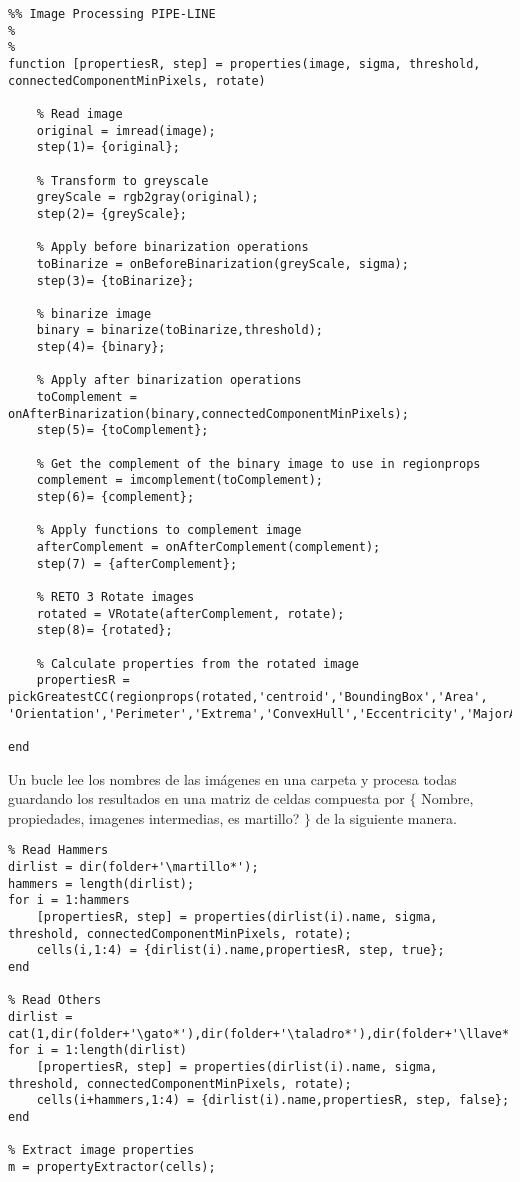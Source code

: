 \documentclass[es,gi]{ifirak}\usepackage[]{graphicx}\usepackage[]{color}
\begin{document}
\begin{lstlisting}
%% Image Processing PIPE-LINE
%
%
function [propertiesR, step] = properties(image, sigma, threshold, connectedComponentMinPixels, rotate)

    % Read image
    original = imread(image);
    step(1)= {original};
    
    % Transform to greyscale
    greyScale = rgb2gray(original);
    step(2)= {greyScale};

    % Apply before binarization operations
    toBinarize = onBeforeBinarization(greyScale, sigma);
    step(3)= {toBinarize};
    
    % binarize image
    binary = binarize(toBinarize,threshold);
    step(4)= {binary};
    
    % Apply after binarization operations
    toComplement = onAfterBinarization(binary,connectedComponentMinPixels);
    step(5)= {toComplement};
    
    % Get the complement of the binary image to use in regionprops
    complement = imcomplement(toComplement);
    step(6)= {complement};
    
    % Apply functions to complement image
    afterComplement = onAfterComplement(complement);
    step(7) = {afterComplement};
   
    % RETO 3 Rotate images
    rotated = VRotate(afterComplement, rotate);
    step(8)= {rotated};
    
    % Calculate properties from the rotated image
    propertiesR = pickGreatestCC(regionprops(rotated,'centroid','BoundingBox','Area', 'Orientation','Perimeter','Extrema','ConvexHull','Eccentricity','MajorAxisLength','MinorAxisLength','Solidity'));
    
end
\end{lstlisting}

Un bucle lee los nombres de las imágenes en una carpeta y procesa todas guardando los resultados en una matriz de celdas compuesta por $\lbrace$ Nombre, propiedades, imagenes intermedias, es martillo? $\rbrace$ de la siguiente manera.

\begin{lstlisting}
% Read Hammers
dirlist = dir(folder+'\martillo*');
hammers = length(dirlist);
for i = 1:hammers
    [propertiesR, step] = properties(dirlist(i).name, sigma, threshold, connectedComponentMinPixels, rotate);
    cells(i,1:4) = {dirlist(i).name,propertiesR, step, true};
end

% Read Others
dirlist = cat(1,dir(folder+'\gato*'),dir(folder+'\taladro*'),dir(folder+'\llave*'),dir(folder+'\hacha*'),dir(folder+'\destorni*'));
for i = 1:length(dirlist)
    [propertiesR, step] = properties(dirlist(i).name, sigma, threshold, connectedComponentMinPixels, rotate);
    cells(i+hammers,1:4) = {dirlist(i).name,propertiesR, step, false};
end

% Extract image properties
m = propertyExtractor(cells);
\end{lstlisting}
\end{document}
